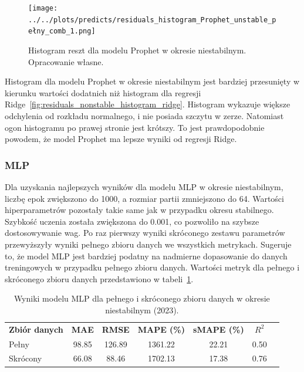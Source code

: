 \begin{figure}[H]
    \centering
    \texttt{[image: ../../plots/predicts/residuals\_histogram\_Prophet\_unstable\_pełny\_comb\_1.png]}
    \caption{Histogram reszt dla modelu Prophet w okresie niestabilnym. Opracowanie własne.}
    \label{fig:prophet_residuals_non_stable}
\end{figure}

Histogram dla modelu Prophet w okresie niestabilnym jest bardziej przesunięty w kierunku wartości dodatnich niż histogram dla regresji Ridge~\ref{fig:residuals_nonstable_histogram_ridge}. Histogram wykazuje większe odchylenia od rozkładu normalnego, i nie posiada szczytu w zerze. Natomiast ogon histogramu po prawej stronie jest krótszy. To jest prawdopodobnie powodem, że model Prophet ma lepsze wyniki od regresji Ridge. 

\subsubsection{MLP}

Dla uzyskania najlepszych wyników dla modelu MLP w okresie niestabilnym, liczbę epok zwiększono do 1000, a rozmiar partii zmniejszono do 64. Wartości hiperparametrów pozostały takie same jak w przypadku okresu stabilnego. Szybkość uczenia została zwiększona do 0.001, co pozwoliło na szybsze dostosowywanie wag. Po raz pierwszy wyniki skróconego zestawu parametrów przewyższyły wyniki pełnego zbioru danych we wszystkich metrykach. Sugeruje to, że model MLP jest bardziej podatny na nadmierne dopasowanie do danych treningowych w przypadku pełnego zbioru danych.\newline
Wartości metryk dla pełnego i skróconego zbioru danych przedstawiono w tabeli~\ref{tab:mlp_results_combined_nonstable}.

\begin{table}[H]
    \centering
    \caption{Wyniki modelu MLP dla pełnego i skróconego zbioru danych w okresie niestabilnym (2023).}
    \label{tab:mlp_results_combined_nonstable}
    \begin{tabular}{|l|cccccc|}
        \hline
        \textbf{Zbiór danych} & \textbf{MAE} & \textbf{RMSE} & \textbf{MAPE (\%)} & \textbf{sMAPE (\%)} & \textbf{\(R^2\)} \\
        Pełny     & 98.85 & 126.89 & 1361.22 & 22.21 & 0.50 \\
        Skrócony  & 66.08 & 88.46 & 1702.13 & 17.38 & 0.76 \\
        \hline
    \end{tabular}
\end{table}

